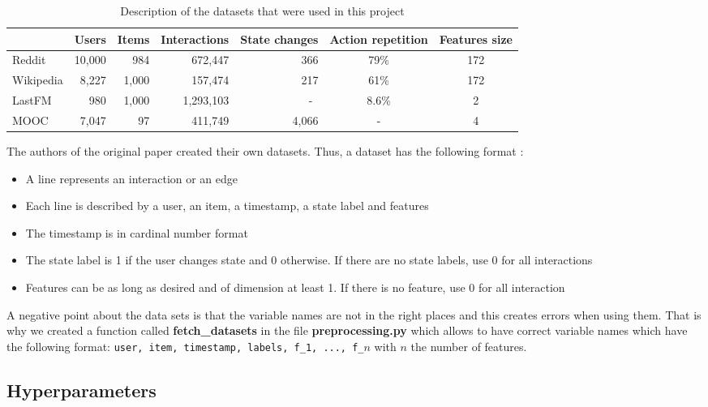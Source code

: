 \setlength\tabcolsep{0.12cm} %
\begin{table}[H]
    \centering
    \begin{tabular}{@{}lrrrrcc@{}}
    \toprule
    & Users & Items & Interactions & State changes & Action repetition & Features size \\
    \midrule
    Reddit & 10,000 & 984 & 672,447 & 366 & 79\% & 172 \\
    Wikipedia & 8,227 & 1,000 & 157,474 & 217 & 61\% & 172 \\
    LastFM & 980 & 1,000 & 1,293,103 & -\textcolor{white}{0} & 8.6\% & 2 \\
    MOOC & 7,047 & 97 & 411,749 & 4,066 & - & 4 \\
    \bottomrule
    \end{tabular}
    \caption{Description of the datasets that were used in this project}
    \label{description data}
\end{table}
\setlength\tabcolsep{6pt} %

The authors of the original paper created their own datasets. Thus, a dataset has the following format :
\begin{itemize}
    \item A line represents an interaction or an edge
    \item Each line is described by a user, an item, a timestamp, a state label and features
    \item The timestamp is in cardinal number format
    \item The state label is 1 if the user changes state and 0 otherwise. If there are no state labels, use 0 for all interactions
    \item Features can be as long as desired and of dimension at least 1. If there is no feature, use 0 for all interaction
\end{itemize}
A negative point about the data sets is that the variable names are not in the right places and this creates errors when using them. That is why we created a function called \textbf{fetch\_datasets} in the file \textbf{preprocessing.py} which allows to have correct variable names which have the following format: \texttt{user, item, timestamp, labels, f\_1, ..., f\_$n$} with $n$ the number of features.\\

\subsection*{Hyperparameters}

